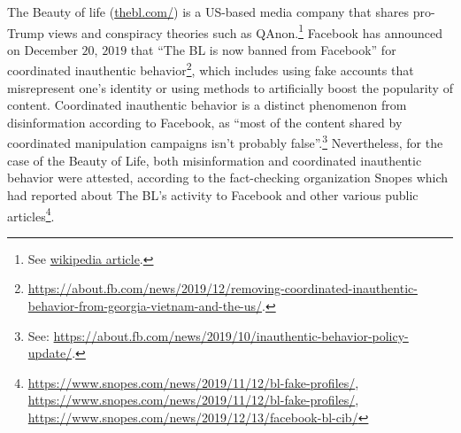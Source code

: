 \documentclass{article}
\begin{document}
The Beauty of life (\href{https://thebl.com/}{thebl.com/}) is a US-based media company that shares pro-Trump views and conspiracy theories such as QAnon.\footnote{ See \href{https://en.wikipedia.org/wiki/The\_Epoch\_Times\#Removal\_of\_The\_BL\_(The\_Beauty\_of\_Life)\_from\_Facebook}{wikipedia article}.} Facebook has announced on December $20$, $2019$ that ``The BL is now banned from Facebook'' for coordinated inauthentic behavior\footnote{\href{https://about.fb.com/news/2019/12/removing-coordinated-inauthentic-behavior-from-georgia-vietnam-and-the-us/}{https://about.fb.com/news/2019/12/removing-coordinated-inauthentic-behavior-from-georgia-vietnam-and-the-us/}.}, which includes using fake accounts that misrepresent one's identity or using methods to artificially boost the popularity of content. Coordinated inauthentic behavior is a distinct phenomenon from disinformation according to Facebook, as ``most of the content shared by coordinated manipulation campaigns isn’t probably false”.\footnote{See: \href{https://about.fb.com/news/2019/10/inauthentic-behavior-policy-update/}{https://about.fb.com/news/2019/10/inauthentic-behavior-policy-update/}.} Nevertheless, for the case of the Beauty of Life, both misinformation and coordinated inauthentic behavior were attested, according to the fact-checking organization Snopes which had reported about The BL’s activity to Facebook and other various public articles\footnote{\href{ https://www.snopes.com/news/2019/11/12/bl-fake-profiles/}{https://www.snopes.com/news/2019/11/12/bl-fake-profiles/}, \href{https://www.snopes.com/news/2019/11/12/bl-fake-profiles/}{https://www.snopes.com/news/2019/11/12/bl-fake-profiles/}, \href{https://www.snopes.com/news/2019/12/13/facebook-bl-cib/}{https://www.snopes.com/news/2019/12/13/facebook-bl-cib/}}.
\end{document}
